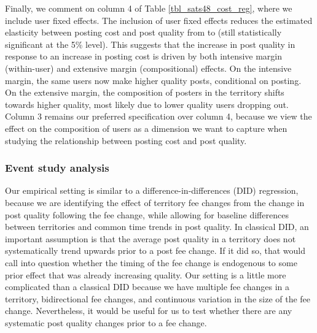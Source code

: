 Finally, we comment on column 4 of Table \ref{tbl_sats48_cost_reg}, where we include user fixed effects. The inclusion of user fixed effects reduces the estimated elasticity between posting cost and post quality from  to  (still statistically significant at the 5\% level). This suggests that the increase in post quality in response to an increase in posting cost is driven by both intensive margin (within-user) and extensive margin (compositional) effects. On the intensive margin, the same users now make higher quality posts, conditional on posting. On the extensive margin, the composition of posters in the territory shifts towards higher quality, most likely due to lower quality users dropping out. Column 3 remains our preferred specification over column 4, because we view the effect on the composition of users as a dimension we want to capture when studying the relationship between posting cost and post quality.


\subsubsection{Event study analysis}

Our empirical setting is similar to a difference-in-differences (DID) regression, because we are identifying the effect of territory fee changes from the change in post quality following the fee change, while allowing for baseline differences between territories and common time trends in post quality. In classical DID, an important assumption is that the average post quality in a territory does not systematically trend upwards prior to a post fee change. If it did so, that would call into question whether the timing of the fee change is endogenous to some prior effect that was already increasing quality. Our setting is a little more complicated than a classical DID because we have multiple fee changes in a territory, bidirectional fee changes, and continuous variation in the size of the fee change. Nevertheless, it would be useful for us to test whether there are any systematic post quality changes prior to a fee change.

